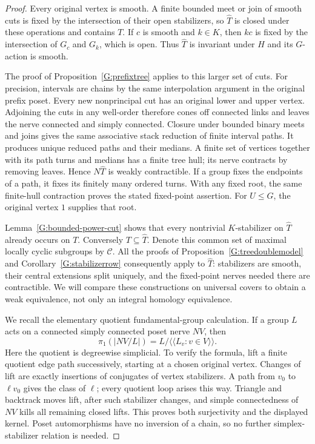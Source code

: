 \begin{proof}
Every original vertex is smooth. A finite bounded meet or join
of smooth cuts is fixed by the intersection of their open
stabilizers, so $\widehat T$ is closed under these operations
and contains $T$. If $c$ is smooth and $k\in K$, then $kc$
is fixed by the intersection of $G_c$ and $G_k$, which is
open. Thus $\widehat T$ is invariant under $H$ and its
$G$-action is smooth.

The proof of Proposition~\ref{G:prefixtree} applies to this
larger set of cuts. For precision, intervals are chains by
the same interpolation argument in the original prefix poset.
Every new nonprincipal cut has an original lower and upper
vertex. Adjoining the cuts in any well-order therefore cones
off connected links and leaves the nerve connected and simply
connected. Closure under bounded binary meets and joins gives
the same associative stack reduction of finite interval paths.
It produces unique reduced paths and their medians. A finite
set of vertices together with its path turns and medians has
a finite tree hull; its nerve contracts by removing leaves.
Hence $N\widehat T$ is weakly contractible. If a group fixes
the endpoints of a path, it fixes its finitely many ordered
turns. With any fixed root, the same finite-hull contraction
proves the stated fixed-point assertion. For $U\le G$, the
original vertex $1$ supplies that root.

Lemma~\ref{G:bounded-power-cut} shows that every nontrivial
$K$-stabilizer on $\widehat T$ already occurs on $T$.
Conversely $T\subseteq\widehat T$. Denote this common set of
maximal locally cyclic subgroups by $\mathscr C$.
All the proofs of Proposition~\ref{G:treedoublemodel} and
Corollary~\ref{G:stabilizerrow} consequently apply to
$\widehat T$: stabilizers are smooth, their central extensions
split uniquely, and the fixed-point nerves needed there are
contractible. We will compare these constructions on universal
covers to obtain a weak equivalence, not only an integral
homology equivalence.

We recall the elementary quotient fundamental-group calculation.
If a group $L$ acts on a connected simply connected poset nerve
$NV$, then
\[
 \pi_1(|NV/L|)=L/\langle\!\langle L_v:v\in V\rangle\!\rangle.
\]
Here the quotient is degreewise simplicial. To verify the
formula, lift a finite quotient edge path successively, starting
at a chosen original vertex. Changes of lift are exactly
insertions of conjugates of vertex stabilizers. A path from
$v_0$ to $\ell v_0$ gives the class of $\ell$; every quotient
loop arises this way. Triangle and backtrack moves lift, after
such stabilizer changes, and simple connectedness of $NV$
kills all remaining closed lifts. This proves both surjectivity
and the displayed kernel. Poset automorphisms have no inversion
of a chain, so no further simplex-stabilizer relation is needed.


\end{proof}
